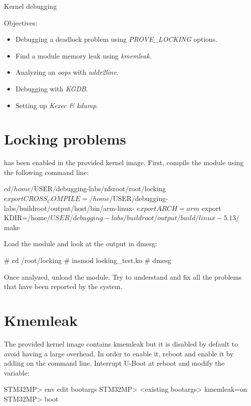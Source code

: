 \subchapter
{Kernel debugging}
{Objectives:
  \begin{itemize}
    \item Debugging a deadlock problem using {\em PROVE\_LOCKING} options.
    \item Find a module memory leak using {\em kmemleak}.
    \item Analyzing an {\em oops} with {\em addr2line}.
    \item Debugging with {\em KGDB}.
    \item Setting up {\em Kexec \& kdump}.
  \end{itemize}
}

\section{Locking problems}

 has been enabled in the provided kernel image.
First, compile the module using the following command line:

\begin{bashinput}
$ cd /home/$USER/debugging-labs/nfsroot/root/locking
$ export CROSS_COMPILE=/home/$USER/debugging-labs/buildroot/output/host/bin/arm-linux-
$ export ARCH=arm
$ export KDIR=/home/$USER/debugging-labs/buildroot/output/build/linux-5.13/
$ make
\end{bashinput}

Load the  module and look at the output in dmesg:

\begin{bashinput}
# cd /root/locking
# insmod locking_test.ko
# dmesg
\end{bashinput}

Once analyzed, unload the module. Try to understand and fix all the problems that
have been reported by the  system.

\section{Kmemleak}

The provided kernel image contains kmemleak but it is disabled by default to
avoid having a large overhead. In order to enable it, reboot and enable it by
adding  on the command line. Interrupt U-Boot at reboot and
modify the  variable:

\begin{bashinput}
STM32MP> env edit bootargs
STM32MP> <existing bootargs> kmemleak=on
STM32MP> boot
\end{bashinput}

